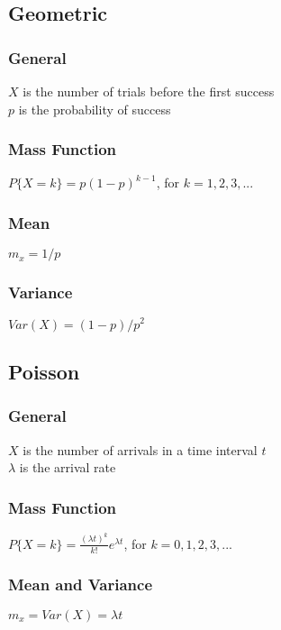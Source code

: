 \subsection*{Geometric }

\subsubsection*{General}
$X$ is the number of trials before the first success \\
$p$ is the probability of success

\subsubsection*{Mass Function}
$P\{X=k\} = p(1-p)^{k-1}$, for $k=1,2,3,...$

\subsubsection*{Mean}
$m_x=1/p$

\subsubsection*{Variance}
$Var(X)=(1-p)/p^2$

    

\subsection*{Poisson }

\subsubsection*{General}
$X$ is the number of arrivals in a time interval $t$ \\
$\lambda$ is the arrival rate

\subsubsection*{Mass Function}
$P\{X=k\}=\frac{(\lambda t)^k}{k!}e^{\lambda t}$, for $k=0,1,2,3,...$

\subsubsection*{Mean and Variance}
$m_x= Var(X) = \lambda t$
    


